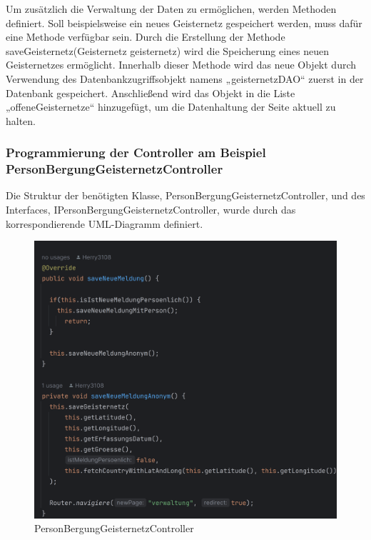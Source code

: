 \documentclass[11pt]{article}
\begin{document}
    Um zusätzlich die Verwaltung der Daten zu ermöglichen, werden Methoden definiert. Soll beispielsweise ein neues
    Geisternetz gespeichert werden, muss dafür eine Methode verfügbar sein. Durch die Erstellung der Methode saveGeisternetz(Geisternetz geisternetz) wird die Speicherung eines neuen Geisternetzes ermöglicht.
    Innerhalb dieser Methode wird das neue Objekt durch Verwendung des Datenbankzugriffsobjekt namens „geisternetzDAO“ zuerst in der Datenbank gespeichert. Anschließend wird das Objekt in die Liste „offeneGeisternetze“ hinzugefügt, um die 
    Datenhaltung der Seite aktuell zu halten.
    
    \newpage
    \subsubsection{Programmierung der Controller am Beispiel PersonBergungGeisternetzController}
    Die Struktur der benötigten Klasse, PersonBergungGeisternetzController, und des Interfaces, IPersonBergungGeisternetzController, wurde durch das korrespondierende UML-Diagramm definiert.
    \begin{figure}[H]
        \centering
        \includegraphics[width=\textwidth]{abbildungen/PersonBergungGeisternetzController.png}
        \caption{PersonBergungGeisternetzController}
        \label{person-bergung-geisternetz-controller}
    \end{figure} 
\end{document}
